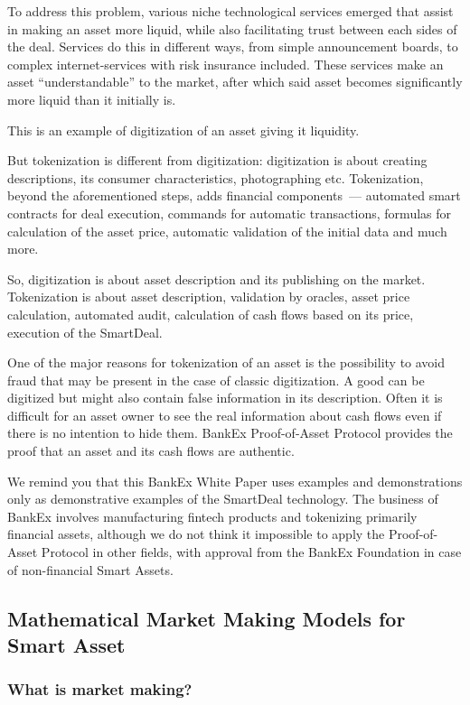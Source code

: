 \documentclass{article}
\begin{document}
\begin{multicols}{2}
To address this problem, various niche technological services emerged that assist in making an asset more liquid, while also facilitating trust between each sides of the deal. Services do this in different ways, from simple announcement boards, to complex internet-services with risk insurance included. These services make an asset “understandable” to the market, after which said asset becomes significantly more liquid than it initially is.

This is an example of digitization of an asset giving it liquidity.

But tokenization is different from digitization: digitization is about creating descriptions, its consumer characteristics, photographing etc. Tokenization, beyond the aforementioned steps, adds financial components~--- automated smart contracts for deal execution, commands for automatic transactions, formulas for calculation of the asset price, automatic validation of the initial data and much more.

So, digitization is about asset description and its publishing on the market. Tokenization is about asset description, validation by oracles, asset price calculation, automated audit, calculation of cash flows based on its price, execution of the SmartDeal.

One of the major reasons for tokenization of an asset is the possibility to avoid fraud that may be present in the case of classic digitization. A good can be digitized but might also contain false information in its description. Often it is difficult for an asset owner to see the real information about cash flows even if there is no intention to hide them. BankEx Proof-of-Asset Protocol provides the proof that an asset and its cash flows are authentic.

We remind you that this BankEx White Paper uses examples and demonstrations only as demonstrative examples of the SmartDeal technology. The business of BankEx involves manufacturing fintech products and tokenizing primarily financial assets, although we do not think it impossible to apply the Proof-of-Asset Protocol in other fields, with approval from the BankEx Foundation in case of non-financial Smart Assets. 

\subsection{Mathematical Market Making Models for Smart Asset}

\subsubsection*{What is market making?}


\end{multicols}
\end{document}
